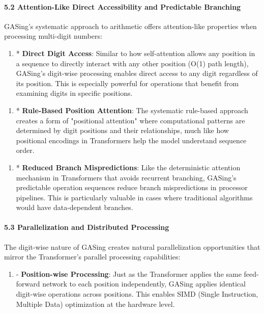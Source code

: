 \paragraph{5.2 Attention-Like Direct Accessibility and Predictable Branching}
GASing's systematic approach to arithmetic offers attention-like properties when processing multi-digit numbers:

\begin{enumerate}
  \item * \textbf{Direct Digit Access}: Similar to how self-attention allows any position in a sequence to directly interact with any other position (O(1) path length), GASing's digit-wise processing enables direct access to any digit regardless of its position. This is especially powerful for operations that benefit from examining digits in specific positions.
\end{enumerate}

\begin{enumerate}
  \item * \textbf{Rule-Based Position Attention}: The systematic rule-based approach creates a form of "positional attention" where computational patterns are determined by digit positions and their relationships, much like how positional encodings in Transformers help the model understand sequence order.
\end{enumerate}

\begin{enumerate}
  \item * \textbf{Reduced Branch Mispredictions}: Like the deterministic attention mechanism in Transformers that avoids recurrent branching, GASing's predictable operation sequences reduce branch mispredictions in processor pipelines. This is particularly valuable in cases where traditional algorithms would have data-dependent branches.
\end{enumerate}

\paragraph{5.3 Parallelization and Distributed Processing}
The digit-wise nature of GASing creates natural parallelization opportunities that mirror the Transformer's parallel processing capabilities:

\begin{enumerate}
  \item - \textbf{Position-wise Processing}: Just as the Transformer applies the same feed-forward network to each position independently, GASing applies identical digit-wise operations across positions. This enables SIMD (Single Instruction, Multiple Data) optimization at the hardware level.
\end{enumerate}

